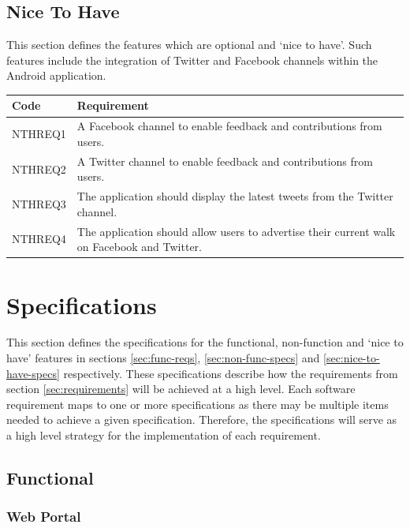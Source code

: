 \documentclass[11pt,a4paper]{article}
\begin{document}
\subsection{Nice To Have}
\label{sec:nice-to-have}

This section defines the features which are optional and `nice to have'.
Such features include the integration of Twitter and Facebook channels within the Android application.

\begin{longtable}{|p{2.5cm}p{13cm}|}
\hline
\textbf{Code} & \textbf{Requirement} \\

\hline
NTHREQ1 & A Facebook channel to enable feedback and contributions from users. \\ \hline
NTHREQ2 & A Twitter channel to enable feedback and contributions from users. \\ \hline
NTHREQ3 & The application should display the latest tweets from the Twitter channel. \\ \hline
NTHREQ4 & The application should allow users to advertise their current walk on Facebook and Twitter. \\ \hline
\end{longtable}

\section{Specifications}
\label{sec:specifications}

This section defines the specifications for the functional, non-function and `nice to have' features in sections \ref{sec:func-reqs}, \ref{sec:non-func-specs} and \ref{sec:nice-to-have-specs} respectively.
These specifications describe how the requirements from section \ref{sec:requirements} will be achieved at a high level.
Each software requirement maps to one or more specifications as there may be multiple items needed to achieve a given specification.
Therefore, the specifications will serve as a high level strategy for the implementation of each requirement.

\subsection{Functional}
\label{sec:func-specs}

\subsubsection{Web Portal}
\end{document}
